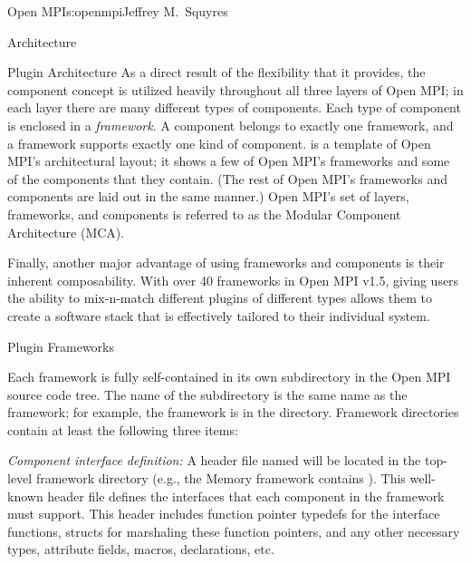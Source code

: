 \begin{aosachapter}{Open MPI}{s:openmpi}{Jeffrey M.\ Squyres}
\begin{aosasect1}{Architecture}
\begin{aosasect2}{Plugin Architecture}
As a direct result of the flexibility that it provides, the component
concept is utilized heavily throughout all three layers of Open MPI;
in each layer there are many different types of components.
%
Each type of component is enclosed in a \emph{framework}.
%
A component belongs to exactly one framework, and a framework supports
exactly one kind of component.
%
 is a template of Open MPI's architectural
layout; it shows a few of Open MPI's frameworks and some of the
components that they contain.  (The rest of Open MPI's frameworks and
components are laid out in the same manner.)
%
Open MPI's set of layers, frameworks, and components is referred to as
the Modular Component Architecture (MCA).


Finally, another major advantage of using frameworks and components is
their inherent composability.  With over 40 frameworks in Open MPI
v1.5, giving users the ability to mix-n-match different plugins of
different types allows them to create a software stack that is
effectively tailored to their individual system.

\end{aosasect2}


\begin{aosasect2}{Plugin Frameworks}

Each framework is fully self-contained in its own subdirectory in the
Open MPI source code tree.  The name of the subdirectory is the same
name as the framework; for example, the  framework is in
the  directory.  
%
Framework directories contain at least the following three items:

\begin{aosaenumerate}
\item \emph{Component interface definition:} A header file named 
 will be located in the top-level framework
  directory (e.g., the Memory framework contains 
  ).  This well-known header file defines the
  interfaces that each component in the framework must support.  This
  header includes function pointer typedefs for the interface
  functions, structs for marshaling these function pointers, and any
  other necessary types, attribute fields, macros, declarations, etc.


\end{aosaenumerate}
\end{aosasect2}
\end{aosasect1}
\end{aosachapter}
